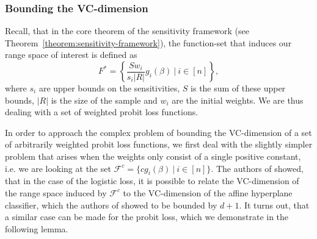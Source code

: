 \subsubsection{Bounding the VC-dimension}

Recall, that in the core theorem of the sensitivity
framework (see Theorem~\ref{theorem:sensitivity-framework}),
the function-set that induces our range space of interest
is defined as
\begin{equation*}
    F^\ast = \left\{ \frac{S w_i}{s_i |R|} g_i(\beta) \ |\ i \in [n] \right\},
\end{equation*}
where $s_i$ are upper bounds on the sensitivities, $S$ is the
sum of these upper bounds, $|R|$ is the size of the sample and
$w_i$ are the initial weights.
We are thus dealing with a set of weighted probit loss functions.

In order to approach the complex problem of bounding the VC-dimension
of a set of arbitrarily weighted probit loss functions, we first
deal with the slightly simpler problem that arises when the weights
only consist of a single positive constant, i.e. we are looking at the
set $\mathcal{F}^c = \{ c g_i(\beta) \ | \ i \in [n] \}$.
The authors of \cite{scalable-bayesian-logreg} showed, that
in the case of the logistic loss,
it is possible to relate the VC-dimension of the
range space induced by $\mathcal{F}^c$ to the VC-dimension of
the affine hyperplane classifier, which the authors of
\cite{computational-learning-theory} showed to be bounded by $d + 1$.
It turns out, that a similar case can be made for the probit
loss, which we demonstrate in the following lemma.

